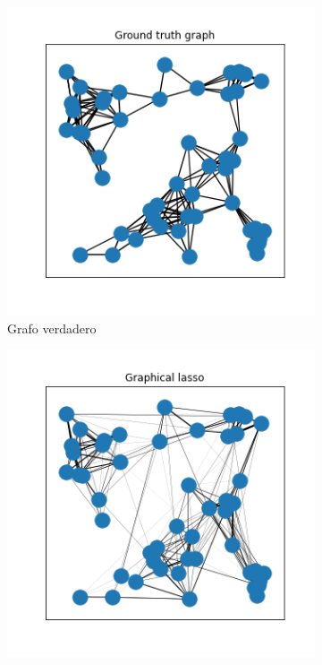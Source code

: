 \documentclass{article}
\begin{document}
\begin{figure}[htb]
    \centering
    \begin{subfigure}[t]{0.24\linewidth}
        \centering
        \includegraphics[width=\textwidth]{imagenes/generated_graph_syntetic/ground_truth_graph.png}
        \caption{Grafo verdadero}
    \end{subfigure}\hfill
    \begin{subfigure}[t]{0.24\linewidth}
        \centering
        \includegraphics[width=\textwidth]{imagenes/generated_graph_syntetic/graphical_lasso.png}

\end{subfigure}
\end{figure}
\end{document}
